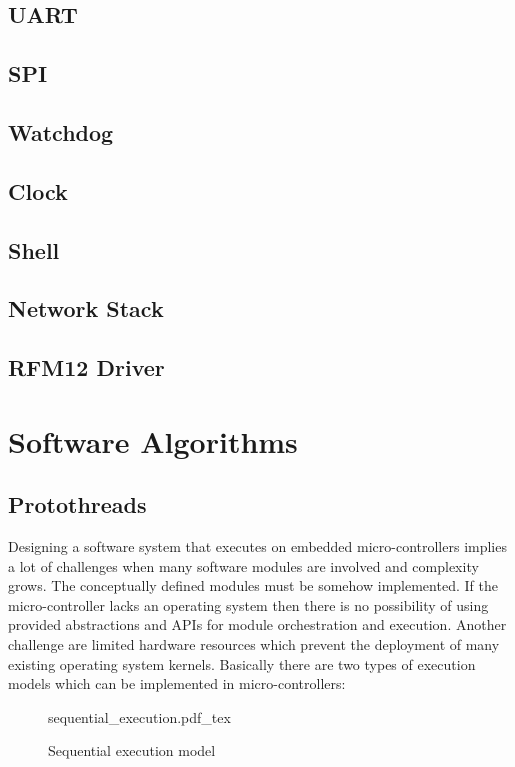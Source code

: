 \section{UART}
\section{SPI}
\section{Watchdog}
\section{Clock}
\section{Shell}
\section{Network Stack}
\section{RFM12 Driver}

\chapter{Software Algorithms}
\section{Protothreads}
Designing a software system that executes on embedded micro-controllers implies a lot of challenges when many software modules are involved and complexity grows. The conceptually defined modules must be somehow implemented. If the micro-controller lacks an operating system then there is no possibility of using provided abstractions and APIs for module orchestration and execution. Another challenge are limited hardware resources which prevent the deployment of many existing operating system kernels. Basically there are two types of execution models which can be implemented in micro-controllers:


\begin{figure}
    \centering
    {sequential_execution.pdf_tex}
    \caption{Sequential execution model}
\end{figure}

